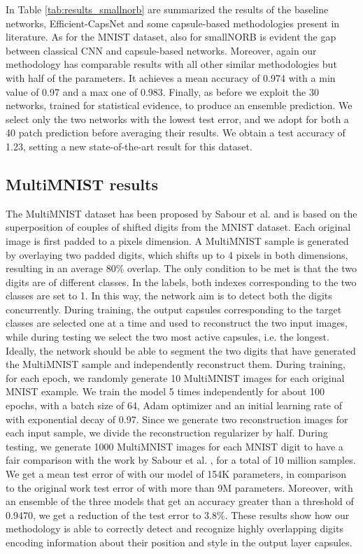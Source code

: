 \documentclass{article}
\begin{document}
In Table \ref{tab:results_smallnorb} are summarized the results of the baseline networks, Efficient-CapsNet and some capsule-based methodologies present in literature. As for the MNIST dataset, also for smallNORB is evident the gap between classical CNN and capsule-based networks. Moreover, again our methodology has comparable results with all other similar methodologies but with half of the parameters. It achieves a mean accuracy of 0.974 with a min value of 0.97 and a max one of 0.983. Finally, as before we exploit the 30 networks, trained for statistical evidence, to produce an ensemble prediction. We select only the two networks with the lowest test error, and we adopt for both a 40 patch prediction \cite{hinton2018matrix} before averaging their results. We obtain a test accuracy of 1.23, setting a new state-of-the-art result for this dataset.


\subsection{MultiMNIST results}
The MultiMNIST dataset has been proposed by Sabour et al. \cite{sabour2017dynamic} and is based on the superposition of couples of shifted digits from the MNIST dataset. Each original image is first padded to a  pixels dimension. A MultiMNIST sample is generated by overlaying two padded digits, which shifts up to 4 pixels in both dimensions, resulting in an average 80\% overlap. The only condition to be met is that the two digits are of different classes. In the labels, both indexes corresponding to the two classes are set to 1. In this way, the network aim is to detect both the digits concurrently. During training, the output capsules corresponding to the target classes are selected one at a time and used to reconstruct the two input images, while during testing we select the two most active capsules, i.e. the longest. Ideally, the network should be able to segment the two digits that have generated the MultiMNIST sample and independently reconstruct them. During training, for each epoch, we randomly generate 10 MultiMNIST images for each original MNIST example. We train the model 5 times independently for about 100 epochs, with a batch size of 64, Adam optimizer and an initial learning rate of  with exponential decay of 0.97. Since we generate two reconstruction images for each input sample, we divide the reconstruction regularizer by half. During testing, we generate 1000 MultiMNIST images for each MNIST digit to have a fair comparison with the work by Sabour et al. \cite{sabour2017dynamic}, for a total of 10 million samples. We get a mean test error of  with our model of 154K parameters, in comparison to the original work test error of  with more than 9M parameters. Moreover, with an ensemble of the three models that get an accuracy greater than a threshold of 0.9470, we get a reduction of the test error to 3.8\%. These results show how our methodology is able to correctly detect and recognize highly overlapping digits encoding information about their position and style in the output layer capsules.
\end{document}
